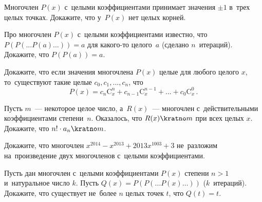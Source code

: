 


\begingroup
    \def\binom#1#2{\mathrm{C}_{#1}^{#2}}%

\begin{problems}

\item
Многочлен $P(x)$ с~целыми коэффициентами принимает значения $\pm 1$ в~трех
целых точках.
Докажите, что у~$P(x)$ нет целых корней.

\item
Про многочлен $P(x)$ с~целыми коэффициентами известно, что
\( P(P( \ldots P(a) \ldots )) = a \) для какого-то целого~$a$
(сделано $n$~итераций).
Докажите, что $P(P(a)) = a$.

\item
Докажите, что если значения многочлена $P(x)$ целые для любого целого $x$,
то~существуют такие целые $c_{0}, c_{1}, \ldots, c_{n}$, что
\[
    P(x)
=
    c_{n} \binom{x}{n} + c_{n-1} \binom{x}{n-1} + \ldots + c_{0} \binom{x}{0}
\, . \]

\item
Пусть $m$~--- некоторое целое число, а~$R(x)$~--- многочлен с~действительными
коэффициентами степени~$n$.
Оказалось, что $R(x) \kratno m$ при всех целых $x$.
Докажите, что ${n!} \cdot a_{n} \kratno m$.

\item
Докажите, что многочлен $x^{2014} - x^{2013} + 2013 x^{1003} + 3$ не~разложим
на~произведение двух многочленов с~целыми коэффициентами.

\item
Пусть дан многочлен с~целыми коэффициентами $P(x)$ степени $n > 1$
и~натуральное число $k$.
Пусть $Q(x) = P(P( \ldots P(x) \ldots ))$ ($k$~итераций).
Докажите, что существует не~более $n$ целых точек $t$, что $Q(t) = t$.

\end{problems}

\endgroup %

